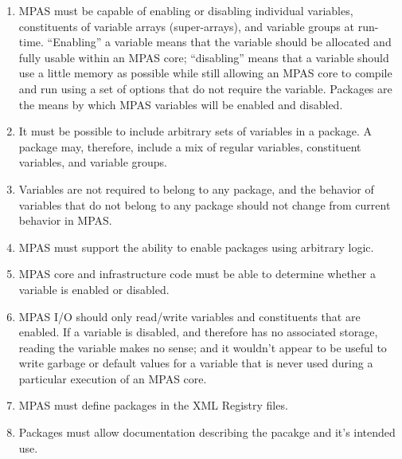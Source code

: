 \documentclass[11pt]{report}
\begin{document}
\begin{enumerate}

\item MPAS must be capable of enabling or disabling individual variables, 
   constituents of variable arrays (super-arrays), and variable groups at run-time.
   ``Enabling'' a variable means that the variable should be allocated and fully usable within
   an MPAS core; ``disabling'' means that a variable should use a little memory as possible 
   while still allowing an MPAS core to compile and run using a set of options that do not 
   require the variable. Packages are the means by which MPAS variables will be
   enabled and disabled.
   
\item It must be possible to include arbitrary sets of variables in a package. A package may, therefore,
   include a mix of regular variables, constituent variables, and variable groups. 

\item Variables are not required to belong to any package, and the behavior of variables that do
   not belong to any package should not change from current behavior in MPAS.
                                                                                                    
\item MPAS must support the ability to enable packages using arbitrary logic.

\item MPAS core and infrastructure code must be able to determine whether a variable is
   enabled or disabled.
   
\item MPAS I/O should only read/write variables and constituents that are enabled. If a variable
   is disabled, and therefore has no associated storage, reading the variable makes no sense; and
   it wouldn't appear to be useful to write garbage or default values for a variable that is never used
   during a particular execution of an MPAS core.

\item MPAS must define packages in the XML Registry files.

\item Packages must allow documentation describing the pacakge and it's intended use.

\end{enumerate}                                                             
\end{document}
